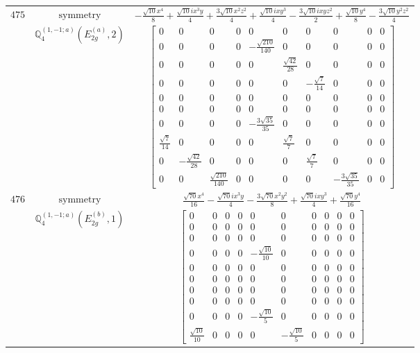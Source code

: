 \documentclass[fleqn,8pt,landscape]{jsarticle}
\begin{document}
\begin{longtable}{ccc}
$ 475 $ & $ \text{symmetry} $ & $ - \frac{\sqrt{10} x^{4}}{8} + \frac{\sqrt{10} i x^{3} y}{4} + \frac{3 \sqrt{10} x^{2} z^{2}}{4} + \frac{\sqrt{10} i x y^{3}}{4} - \frac{3 \sqrt{10} i x y z^{2}}{2} + \frac{\sqrt{10} y^{4}}{8} - \frac{3 \sqrt{10} y^{2} z^{2}}{4} $ \\
$  $ & $ \mathbb{Q}_{4}^{(1,-1;a)}(E_{2g}^{(a)},2) $ & $ \begin{bmatrix} 0 & 0 & 0 & 0 & 0 & 0 & 0 & 0 & 0 & 0 \\ 0 & 0 & 0 & 0 & - \frac{\sqrt{210}}{140} & 0 & 0 & 0 & 0 & 0 \\ 0 & 0 & 0 & 0 & 0 & \frac{\sqrt{42}}{28} & 0 & 0 & 0 & 0 \\ 0 & 0 & 0 & 0 & 0 & 0 & - \frac{\sqrt{7}}{14} & 0 & 0 & 0 \\ 0 & 0 & 0 & 0 & 0 & 0 & 0 & 0 & 0 & 0 \\ 0 & 0 & 0 & 0 & 0 & 0 & 0 & 0 & 0 & 0 \\ 0 & 0 & 0 & 0 & - \frac{3 \sqrt{35}}{35} & 0 & 0 & 0 & 0 & 0 \\ \frac{\sqrt{7}}{14} & 0 & 0 & 0 & 0 & \frac{\sqrt{7}}{7} & 0 & 0 & 0 & 0 \\ 0 & - \frac{\sqrt{42}}{28} & 0 & 0 & 0 & 0 & \frac{\sqrt{7}}{7} & 0 & 0 & 0 \\ 0 & 0 & \frac{\sqrt{210}}{140} & 0 & 0 & 0 & 0 & - \frac{3 \sqrt{35}}{35} & 0 & 0 \end{bmatrix} $ \\ \hline
$ 476 $ & $ \text{symmetry} $ & $ \frac{\sqrt{70} x^{4}}{16} - \frac{\sqrt{70} i x^{3} y}{4} - \frac{3 \sqrt{70} x^{2} y^{2}}{8} + \frac{\sqrt{70} i x y^{3}}{4} + \frac{\sqrt{70} y^{4}}{16} $ \\
$  $ & $ \mathbb{Q}_{4}^{(1,-1;a)}(E_{2g}^{(b)},1) $ & $ \begin{bmatrix} 0 & 0 & 0 & 0 & 0 & 0 & 0 & 0 & 0 & 0 \\ 0 & 0 & 0 & 0 & 0 & 0 & 0 & 0 & 0 & 0 \\ 0 & 0 & 0 & 0 & 0 & 0 & 0 & 0 & 0 & 0 \\ 0 & 0 & 0 & 0 & - \frac{\sqrt{10}}{10} & 0 & 0 & 0 & 0 & 0 \\ 0 & 0 & 0 & 0 & 0 & 0 & 0 & 0 & 0 & 0 \\ 0 & 0 & 0 & 0 & 0 & 0 & 0 & 0 & 0 & 0 \\ 0 & 0 & 0 & 0 & 0 & 0 & 0 & 0 & 0 & 0 \\ 0 & 0 & 0 & 0 & 0 & 0 & 0 & 0 & 0 & 0 \\ 0 & 0 & 0 & 0 & - \frac{\sqrt{10}}{5} & 0 & 0 & 0 & 0 & 0 \\ \frac{\sqrt{10}}{10} & 0 & 0 & 0 & 0 & - \frac{\sqrt{10}}{5} & 0 & 0 & 0 & 0 \end{bmatrix} $ \\ \hline

\end{longtable}
\end{document}
